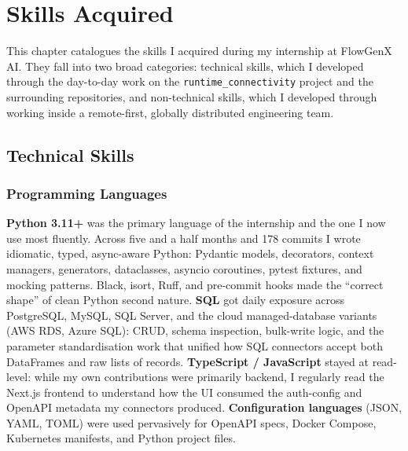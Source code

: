 \chapter{Skills Acquired}
\label{ch:skills}

This chapter catalogues the skills I acquired during my internship at
FlowGenX AI. They fall into two broad categories: technical skills,
which I developed through the day-to-day work on the
\texttt{runtime\_connectivity} project and the surrounding repositories,
and non-technical skills, which I developed through working inside a
remote-first, globally distributed engineering team.

\section{Technical Skills}

\subsection{Programming Languages}
\textbf{Python 3.11+} was the primary language of the internship and
the one I now use most fluently. Across five and a half months and
178 commits I wrote idiomatic, typed, async-aware Python: Pydantic
models, decorators, context managers, generators, dataclasses,
asyncio coroutines, pytest fixtures, and mocking patterns. Black,
isort, Ruff, and pre-commit hooks made the ``correct shape'' of
clean Python second nature. \textbf{SQL} got daily exposure across
PostgreSQL, MySQL, SQL Server, and the cloud managed-database
variants (AWS RDS, Azure SQL): CRUD, schema inspection, bulk-write
logic, and the parameter standardisation work that unified how SQL
connectors accept both DataFrames and raw lists of records.
\textbf{TypeScript / JavaScript} stayed at read-level: while my own
contributions were primarily backend, I regularly read the Next.js
frontend to understand how the UI consumed the auth-config and
OpenAPI metadata my connectors produced. \textbf{Configuration
languages} (JSON, YAML, TOML) were used pervasively for OpenAPI
specs, Docker Compose, Kubernetes manifests, and Python project
files.

